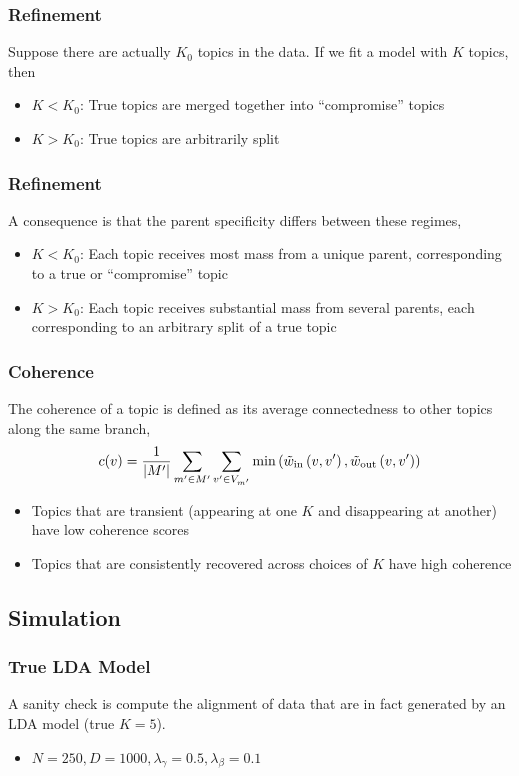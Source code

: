 \documentclass{beamer}
\begin{document}
\begin{frame}
  \frametitle{Refinement}
  Suppose there are actually $K_0$ topics in the data. If we fit a model with
  $K$ topics, then
  \begin{itemize}
    \item $K < K_0$: True topics are merged together into ``compromise'' topics
    \item $K > K_0$: True topics are arbitrarily split
  \end{itemize}
\end{frame}

\begin{frame}
  \frametitle{Refinement}
  A consequence is that the parent specificity differs between these
  regimes,
  \begin{itemize}
    \item $K < K_0$: Each topic receives most mass from a unique parent,
    corresponding to a true or ``compromise'' topic
    \item $K > K_0$: Each topic receives substantial mass from several parents,
    each corresponding to an arbitrary split of a true topic
  \end{itemize}
\end{frame}

\begin{frame}
  \frametitle{Coherence}
  The coherence of a topic is defined as its average connectedness to other
  topics along the same branch,
  \begin{align*}
    c(v) = \frac{1}{|M'|} \sum_{m' \in M'} \sum_{v' \in V_{m'}} \min\left(\tilde w_{\text{in}}\left(v, v'\right), \tilde w_{\text{out}}\left(v, v'\right) \right)
  \end{align*}
  \begin{itemize}
    \item Topics that are transient (appearing at one $K$ and disappearing at
    another) have low coherence scores
    \item Topics that are consistently recovered across choices of $K$ have high
    coherence
  \end{itemize}

\end{frame}

\subsection{Simulation}
\begin{frame}
  \frametitle{True LDA Model}
  A sanity check is compute the alignment of data that are in fact generated by an
  LDA model (true $K = 5$).
  \begin{itemize}
  \item $N = 250, D = 1000, \lambda_{\gamma} = 0.5, \lambda_{\beta} = 0.1$
  \end{itemize}
\end{frame}
\end{document}
